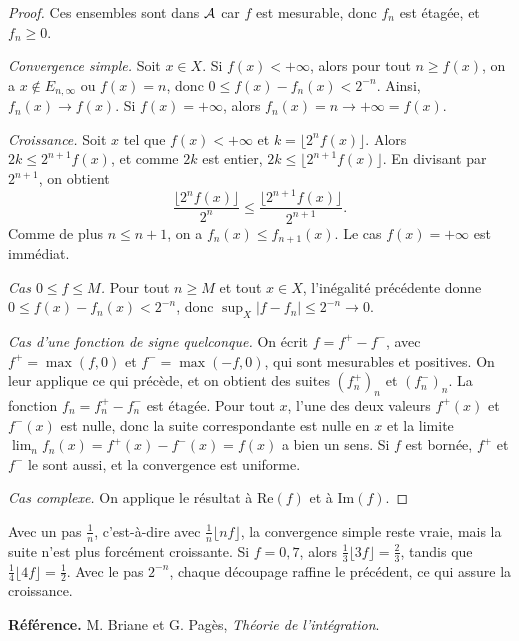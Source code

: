 \documentclass[11pt]{article}
\begin{document}
\begin{proof}
Ces ensembles sont dans $\mathcal{A}$ car $f$ est mesurable, donc $f_n$ est étagée, et $f_n \geq 0$.

\emph{Convergence simple.} Soit $x \in X$. Si $f(x) < +\infty$, alors pour tout $n \geq f(x)$, on a $x\notin E_{n,\infty}$ ou $f(x) = n$, donc $0 \leq f(x)-f_n(x) < 2^{-n}$. Ainsi, $f_n(x) \to f(x)$. Si $f(x) = +\infty$, alors $f_n(x) = n \to +\infty = f(x)$.

\emph{Croissance.} Soit $x$ tel que $f(x)<+\infty$ et $k = \lfloor 2^n f(x)\rfloor$. Alors $2k \leq 2^{n+1}f(x)$, et comme $2k$ est entier, $2k \leq \lfloor 2^{n+1}f(x)\rfloor$. En divisant par $2^{n+1}$, on obtient
\[
  \frac{\lfloor 2^{n}f(x)\rfloor}{2^{n}} \leq \frac{\lfloor 2^{n+1}f(x)\rfloor}{2^{n+1}}.
\]
Comme de plus $n \leq n+1$, on a $f_n(x) \leq f_{n+1}(x)$. Le cas $f(x) = +\infty$ est immédiat.

\emph{Cas $0 \leq f \leq M$.} Pour tout $n \geq M$ et tout $x\in X$, l'inégalité précédente donne $0 \leq f(x)-f_n(x) < 2^{-n}$, donc $\sup_X |f-f_n| \leq 2^{-n} \to 0$.

\emph{Cas d'une fonction de signe quelconque.} On écrit $f = f^+ - f^-$, avec $f^+ = \max(f,0)$ et $f^- = \max(-f,0)$, qui sont mesurables et positives. On leur applique ce qui précède, et on obtient des suites $(f_n^+)_n$ et $(f_n^-)_n$. La fonction $f_n = f_n^+-f_n^-$ est étagée. Pour tout $x$, l'une des deux valeurs $f^+(x)$ et $f^-(x)$ est nulle, donc la suite correspondante est nulle en $x$ et la limite $\lim_nf_n(x) = f^+(x)-f^-(x) = f(x)$ a bien un sens. Si $f$ est bornée, $f^+$ et $f^-$ le sont aussi, et la convergence est uniforme.

\emph{Cas complexe.} On applique le résultat à $\mathrm{Re}(f)$ et à $\mathrm{Im}(f)$.
\end{proof}

\begin{remarque}
Avec un pas $\frac1n$, c'est-à-dire avec $\frac1n\lfloor nf\rfloor$, la convergence simple reste vraie, mais la suite n'est plus forcément croissante. Si $f = 0{,}7$, alors $\frac13\lfloor 3f\rfloor = \frac23$, tandis que $\frac14\lfloor 4f\rfloor = \frac12$. Avec le pas $2^{-n}$, chaque découpage raffine le précédent, ce qui assure la croissance.
\end{remarque}

\vspace{1em}
\textbf{Référence.} M. Briane et G. Pagès, \emph{Théorie de l'intégration}.
\end{document}
